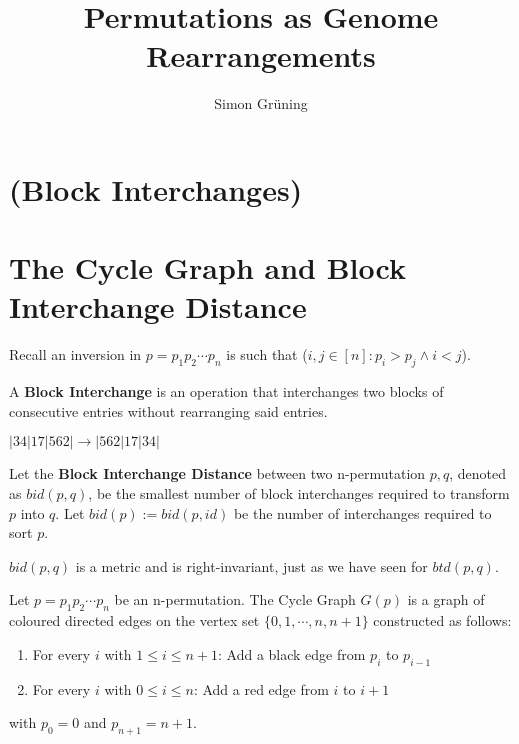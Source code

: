 


\title{Permutations as Genome Rearrangements}
\author{Simon Gr\"uning}
\address[Simon Gr\"uning]{University of Zurich, R\"{a}mistrasse 71, 8006 Zurich}


\maketitle

\section*{(Block Interchanges)}


\clearpage




\section{The Cycle Graph and Block Interchange Distance}

\begin{remark}
Recall an inversion in $p = p_1 p_2 \cdots p_n $ is such that ($ i,j \in [ n ] : p_i > p_j \wedge i < j$).
\end{remark}

\begin{definition}
A \textbf{Block Interchange} is an operation that interchanges two blocks of consecutive entries without rearranging said entries.
\end{definition}

\begin{example}
 $ |34|17|562| \rightarrow |562|17|34| $
\end{example}

\begin{definition}
Let the \textbf{Block Interchange Distance} between two n-permutation $p,q$, denoted as $bid(p,q)$, be the smallest number of block interchanges required to transform $p$ into $q$. Let $bid(p) := bid(p,id)$ be the number of interchanges required to sort $p$.
\end{definition}

\begin{remark}
$bid(p,q)$ is a metric and is right-invariant, just as we have seen for $btd(p,q)$.
\end{remark}

\begin{definition}
Let $p = p_1 p_2 \cdots p_n$ be an n-permutation. The  Cycle Graph $G(p)$ is a graph of coloured directed edges on the vertex set $\{ 0,1, \cdots ,n,n+1 \}$ constructed as follows:
\begin{enumerate}
\item For every $i$ with $1 \leq i \leq n+1$: Add a black edge from $p_i$ to $p_{i-1}$
\item For every $i$ with $0 \leq i \leq n$: Add a red edge from $i$ to $i+1$
\end{enumerate}
with $p_0 = 0$ and $p_{n+1} = n+1$.
\end{definition}

